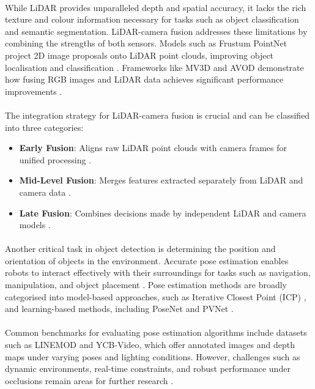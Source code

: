 \paragraph*{} While LiDAR provides unparalleled depth and spatial accuracy, it lacks the rich texture and colour information necessary for tasks such as object classification and semantic segmentation. LiDAR-camera fusion addresses these limitations by combining the strengths of both sensors. Models such as Frustum PointNet project 2D image proposals onto LiDAR point clouds, improving object localisation and classification \cite{qi2018frustumpointnet}. Frameworks like MV3D and AVOD demonstrate how fusing RGB images and LiDAR data achieves significant performance improvements \cite{ku2018mv3d}.

\paragraph*{} The integration strategy for LiDAR-camera fusion is crucial and can be classified into three categories:
\begin{itemize}
    \item \textbf{Early Fusion}: Aligns raw LiDAR point clouds with camera frames for unified processing \cite{ku2018mv3d}.
    \item \textbf{Mid-Level Fusion}: Merges features extracted separately from LiDAR and camera data \cite{chen2017avod}.
    \item \textbf{Late Fusion}: Combines decisions made by independent LiDAR and camera models \cite{qi2018frustumpointnet}.
\end{itemize}

\paragraph*{} Another critical task in object detection is determining the position and orientation of objects in the environment. Accurate pose estimation enables robots to interact effectively with their surroundings for tasks such as navigation, manipulation, and object placement \cite{paul2021object}. Pose estimation methods are broadly categorised into model-based approaches, such as Iterative Closest Point (ICP) \cite{yuan2023accurate}, and learning-based methods, including PoseNet \cite{kendall2015posenet} and PVNet \cite{peng2019pvnet}.

\paragraph*{} Common benchmarks for evaluating pose estimation algorithms include datasets such as LINEMOD and YCB-Video, which offer annotated images and depth maps under varying poses and lighting conditions. However, challenges such as dynamic environments, real-time constraints, and robust performance under occlusions remain areas for further research \cite{chen2022occlusion}.

